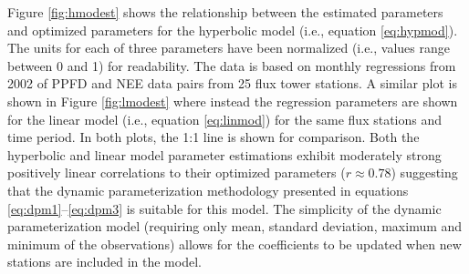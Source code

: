 Figure \ref{fig:hmodest} shows the relationship between the estimated parameters and optimized parameters for the hyperbolic model (i.e., equation \ref{eq:hypmod}).  
The units for each of three parameters have been normalized (i.e., values range between 0 and 1) for readability.  
The data is based on monthly regressions from 2002 of PPFD and NEE data pairs from 25 flux tower stations.  
A similar plot is shown in Figure \ref{fig:lmodest} where instead the regression parameters are shown for the linear model (i.e., equation \ref{eq:linmod}) for the same flux stations and time period.  
In both plots, the 1:1 line is shown for comparison.  
Both the hyperbolic and linear model parameter estimations exhibit moderately strong positively linear correlations to their optimized parameters ($r \approx 0.78$) suggesting that the dynamic parameterization methodology presented in equations \ref{eq:dpm1}--\ref{eq:dpm3} is suitable for this model.  
The simplicity of the dynamic parameterization model (requiring only mean, standard deviation, maximum and minimum of the observations) allows for the coefficients to be updated when new stations are included in the model.


